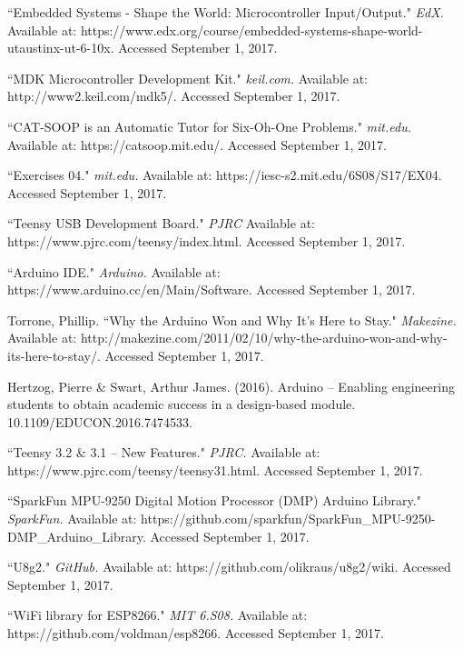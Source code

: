 \documentclass[12pt]{article}
\begin{document}
\clearpage
\raggedright
\begin{thebibliography}{}
``Embedded Systems - Shape the World: Microcontroller Input/Output." \textit{EdX.}  Available at: 
https://www.edx.org/course/embedded-systems-shape-world-utaustinx-ut-6-10x.  Accessed September 1, 2017.

``MDK Microcontroller Development Kit." \textit{keil.com.}  Available at:
http://www2.keil.com/mdk5/. Accessed September 1, 2017.

``CAT-SOOP is an Automatic Tutor for Six-Oh-One Problems."  \textit{mit.edu.}  Available at:
https://catsoop.mit.edu/.  Accessed September 1, 2017.

``Exercises 04."  \textit{mit.edu.} Available at:
https://iesc-s2.mit.edu/6S08/S17/EX04.  Accessed September 1, 2017.

``Teensy USB Development Board."  \textit{PJRC} Available at:
https://www.pjrc.com/teensy/index.html.  Accessed September 1, 2017.

``Arduino IDE." \textit{Arduino.}  Available at:
https://www.arduino.cc/en/Main/Software.  Accessed September 1, 2017.

Torrone, Phillip.  ``Why the Arduino Won and Why It's Here to Stay."  \textit{Makezine.} Available at:
http://makezine.com/2011/02/10/why-the-arduino-won-and-why-its-here-to-stay/.  Accessed September 1, 2017.

Hertzog, Pierre \& Swart, Arthur James. (2016). Arduino -- Enabling engineering students to obtain academic success in a design-based module. 10.1109/EDUCON.2016.7474533.

``Teensy 3.2 \& 3.1 -- New Features." \textit{PJRC.}  Available at:
https://www.pjrc.com/teensy/teensy31.html.  Accessed September 1, 2017.

``SparkFun MPU-9250 Digital Motion Processor (DMP) Arduino Library." \textit{SparkFun.}  Available at: 
https://github.com/sparkfun/SparkFun\_MPU-9250-DMP\_Arduino\_Library.  Accessed September 1, 2017.

``U8g2."  \textit{GitHub.}  Available at: 
https://github.com/olikraus/u8g2/wiki.  Accessed September 1, 2017.

``WiFi library for ESP8266." \textit{MIT 6.S08.}  Available at:
https://github.com/voldman/esp8266.  Accessed September 1, 2017.


\end{thebibliography}
\end{document}
